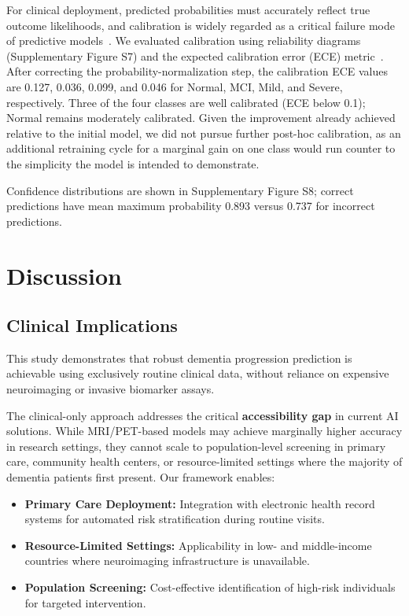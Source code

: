 \documentclass[preprint,12pt]{elsarticle}
\begin{document}
For clinical deployment, predicted probabilities must accurately reflect true outcome likelihoods, and calibration is widely regarded as a critical failure mode of predictive models~\cite{vancalster2019}. We evaluated calibration using reliability diagrams (Supplementary Figure S7) and the expected calibration error (ECE) metric~\cite{guo2017}. After correcting the probability-normalization step, the calibration ECE values are 0.127, 0.036, 0.099, and 0.046 for Normal, MCI, Mild, and Severe, respectively. Three of the four classes are well calibrated (ECE below 0.1); Normal remains moderately calibrated. Given the improvement already achieved relative to the initial model, we did not pursue further post-hoc calibration, as an additional retraining cycle for a marginal gain on one class would run counter to the simplicity the model is intended to demonstrate.

Confidence distributions are shown in Supplementary Figure S8; correct predictions have mean maximum probability 0.893 versus 0.737 for incorrect predictions.

\section{Discussion}

\subsection{Clinical Implications}

This study demonstrates that robust dementia progression prediction is achievable using exclusively routine clinical data, without reliance on expensive neuroimaging or invasive biomarker assays.

The clinical-only approach addresses the critical \textbf{accessibility gap} in current AI solutions. While MRI/PET-based models may achieve marginally higher accuracy in research settings, they cannot scale to population-level screening in primary care, community health centers, or resource-limited settings where the majority of dementia patients first present. Our framework enables:

\begin{itemize}
    \item \textbf{Primary Care Deployment:} Integration with electronic health record systems for automated risk stratification during routine visits.
    \item \textbf{Resource-Limited Settings:} Applicability in low- and middle-income countries where neuroimaging infrastructure is unavailable.
    \item \textbf{Population Screening:} Cost-effective identification of high-risk individuals for targeted intervention.
\end{itemize}
\end{document}
